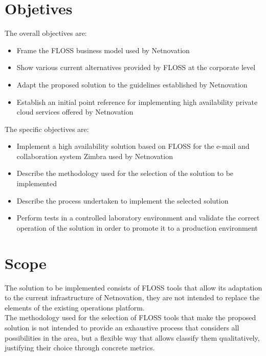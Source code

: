 \documentclass[a4paper, 12pt]{book}
\begin{document}
\section{Objetives}
\label{subsec:objetives}

The overall objectives are:

\begin{itemize}
	\item Frame the FLOSS business model used by Netnovation
	\item Show various current alternatives provided by FLOSS at the corporate level
	\item Adapt the proposed solution to the guidelines established by Netnovation
	\item Establish an initial point reference for implementing high availability private cloud services offered by Netnovation
\end{itemize}

\noindent The specific objectives are:

\begin{itemize}
	\item Implement a high availability solution based on FLOSS for the e-mail and collaboration system Zimbra used by Netnovation
	\item Describe the methodology used for the selection of the solution to be implemented
	\item Describe the process undertaken to implement the selected solution
	\item Perform tests in a controlled laboratory environment and validate the correct operation of the solution in order to promote it to a production environment
\end{itemize}



\section{Scope}
\label{sec:scope}

The solution to be implemented consists of FLOSS tools that allow its adaptation to the current infrastructure of Netnovation, they are not intended to replace the elements of the existing operations  platform.\\

\noindent The methodology used for the selection of FLOSS tools that make the proposed solution is not intended to provide an exhaustive process that considers all possibilities in the area, but a flexible way that allows classify them qualitatively, justifying their choice through concrete metrics.\\
\end{document}
